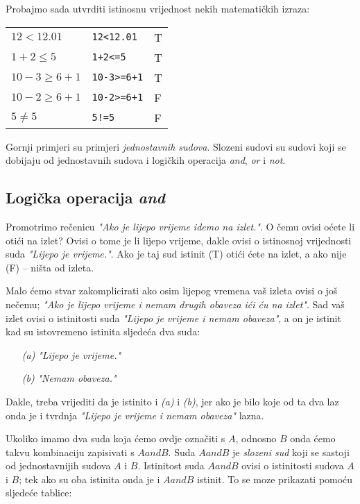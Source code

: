 Probajmo sada utvrditi istinosnu vrijednost nekih matematičkih izraza:

\begin{tabular}{lll}
	$12<12.01$ & \verb+12<12.01+ & T\\
	$1+2\leq 5$ & \verb"1+2<=5" & T\\
	$10-3\geq 6+1$ & \verb"10-3>=6+1" & T \\
	$10-2\geq 6+1$ & \verb"10-2>=6+1" & F \\
	$5\neq 5$ & \verb"5!=5" & F
\end{tabular}

Gornji primjeri su primjeri \emph{jednostavnih sudova}. Slozeni
sudovi su sudovi koji se dobijaju od jednostavnih sudova i logičkih
operacija \emph{and}, \emph{or} i \emph{not}.

\subsection{Logička operacija \emph{and}}

Promotrimo rečenicu \emph{"Ako je lijepo vrijeme
idemo na izlet."}. O čemu ovisi oćete li
otići na izlet? Ovisi o tome je li lijepo vrijeme, dakle ovisi o
istinosnoj vrijednosti suda \emph{"Lijepo je vrijeme."}. Ako je
taj sud istinit (T) otići ćete na izlet, a ako nije (F) -- ništa
od izleta.

Malo ćemo stvar zakomplicirati ako osim lijepog vremena vaš izleta
ovisi o još nečemu; \emph{"Ako je lijepo vrijeme i nemam drugih obaveza
ići ću na izlet"}.
Sad vaš izlet ovisi o istinitosti suda \emph{"Lijepo je vrijeme i nemam obaveza"}, a on je istinit
kad su istovremeno istinita sljedeća dva suda:

\begin{itemize}
	\item[\emph{(a)}] \emph{"Lijepo je vrijeme."}
	\item[\emph{(b)}] \emph{"Nemam obaveza."}
\end{itemize}

Dakle, treba vrijediti da je istinito i \emph{(a)} i \emph{(b)},
jer ako je bilo koje od ta dva laz onda je i tvrdnja \emph{"Lijepo
je vrijeme i nemam obaveza"} lazna.

Ukoliko imamo dva suda koja ćemo ovdje označiti s $A$, odnosno
$B$ onda ćemo takvu kombinaciju zapisivati s $A and B$. Suda $A
and B$ je \emph{slozeni sud} koji se sastoji od jednostavnijih
sudova $A$ i $B$. Istinitost suda $A and B$ ovisi o istinitosti
sudova $A$ i $B$; tek ako su oba istinita onda je i $A and B$
istinit. To se moze prikazati pomoću sljedeće tablice:

